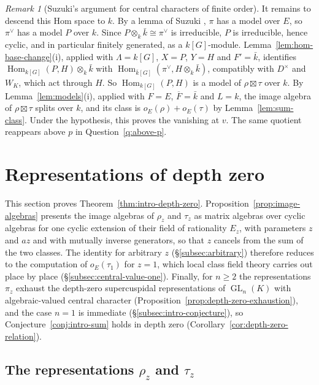 \documentclass[a4paper,11pt]{amsart}
\theoremstyle{definition}
\theoremstyle{remark}
\newtheorem{remark}[theorem]{Remark}
\numberwithin{equation}{section}
\DeclareMathOperator{\GL}{GL}
\DeclareMathOperator{\Hom}{Hom}
\begin{document}
\begin{remark}[Suzuki's argument for central characters of finite order]
It remains to descend this Hom space to $k$. By a lemma of Suzuki \cite[Lemma~4.0.4]{Su23}, $\pi$ has a model over $E$, so $\pi^\vee$ has a model $P$ over $k$. Since $P\otimes_k\bar k\cong\pi^\vee$ is irreducible, $P$ is irreducible, hence cyclic, and in particular finitely generated, as a $k[G]$-module. Lemma~\ref{lem:hom-base-change}(i), applied with $\Lambda=k[G]$, $X=P$, $Y=H$ and $F'=\bar k$, identifies $\Hom_{k[G]}(P,H)\otimes_k\bar k$ with $\Hom_{\bar k[G]}(\pi^\vee,H\otimes_k\bar k)$, compatibly with $D^\times$ and $W_K$, which act through $H$. So $\Hom_{k[G]}(P,H)$ is a model of $\rho\boxtimes\tau$ over $k$. By Lemma~\ref{lem:models}(i), applied with $F=E$, $\overline F=\bar k$ and $L=k$, the image algebra of $\rho\boxtimes\tau$ splits over $k$, and its class is $o_E(\rho)+o_E(\tau)$ by Lemma~\ref{lem:sum-class}. Under the hypothesis, this proves the vanishing at $v$. The same quotient reappears above $p$ in Question~\ref{q:above-p}.
\end{remark}

\section{Representations of depth zero}\label{sec:depth-zero}

This section proves Theorem~\ref{thm:intro-depth-zero}. Proposition~\ref{prop:image-algebras} presents the image algebras of $\rho_z$ and $\tau_z$ as matrix algebras over cyclic algebras for one cyclic extension of their field of rationality $E_z$, with parameters $z$ and $az$ and with mutually inverse generators, so that $z$ cancels from the sum of the two classes. The identity for arbitrary $z$ (\S\ref{subsec:arbitrary}) therefore reduces to the computation of $o_E(\tau_1)$ for $z=1$, which local class field theory carries out place by place (\S\ref{subsec:central-value-one}). Finally, for $n\ge2$ the representations $\pi_z$ exhaust the depth-zero supercuspidal representations of $\GL_n(K)$ with algebraic-valued central character (Proposition~\ref{prop:depth-zero-exhaustion}), and the case $n=1$ is immediate (\S\ref{subsec:intro-conjecture}), so Conjecture~\ref{conj:intro-sum} holds in depth zero (Corollary~\ref{cor:depth-zero-relation}).

\subsection{The representations \texorpdfstring{$\rho_z$ and $\tau_z$}{rho\_z and tau\_z}}\label{subsec:depth-zero-reps}
\end{document}
